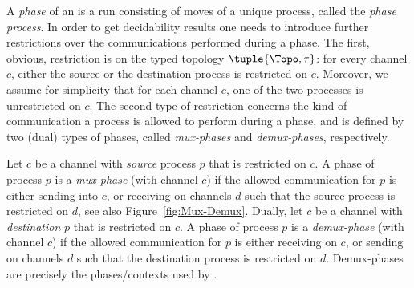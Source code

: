 \documentclass{LMCS}
\begin{document}
\newcommand{\final}{f}
\newcommand{\Mux}{\textit{Mux}}
\newcommand{\Demux}{\textit{Demux}}




A \emph{phase} of an \rqcp is a run consisting of moves of a unique
process, called the \emph{phase process}. In order to get decidability
results one needs to introduce further restrictions over the
communications performed during a phase. The first, obvious,
restriction is on the typed topology $\tuple{\Topo,\tau}$: for every
channel $c$, either the source or the destination process is
restricted on $c$. Moreover, we assume for simplicity that for each
channel $c$, one of the two processes is unrestricted on $c$. The
second type of restriction concerns the kind of communication a
process is allowed to perform during a phase, and is defined by two
(dual) types of phases, called \emph{mux-phases} and
\emph{demux-phases}, respectively.

Let $c$ be a channel with \emph{source} process $p$ that is restricted
on $c$. A phase of process $p$ is a \emph{mux-phase} (with channel
$c$) if the allowed communication for $p$ is either sending into $c$,
or receiving on channels $d$ such that the source process is
restricted on $d$, see also Figure~\ref{fig:Mux-Demux}.  Dually, let
$c$ be a channel with \emph{destination} $p$ that is restricted on
$c$. A phase of process $p$ is a \emph{demux-phase} (with channel $c$)
if the allowed communication for $p$ is either receiving on $c$, or
sending on channels $d$ such that the destination process is restricted on
$d$. Demux-phases are precisely the phases/contexts used by
\cite{latorre-s-2008-299-a}.
\end{document}
